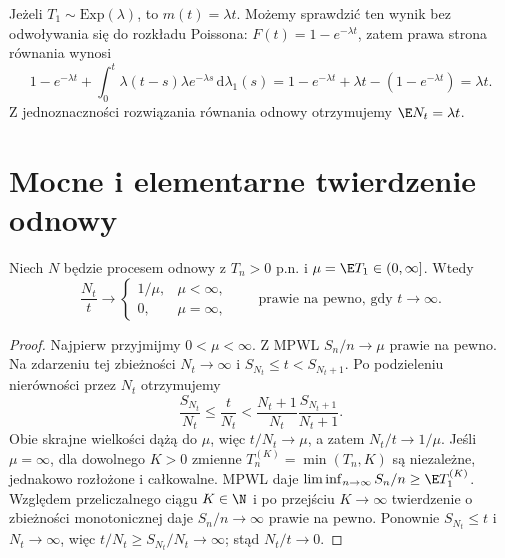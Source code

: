 \begin{przyklad}
Jeżeli $T_1\sim\mathrm{Exp}(\lambda)$, to $m(t)=\lambda t$.
Możemy sprawdzić ten wynik bez odwoływania się do rozkładu Poissona:
$F(t)=1-e^{-\lambda t}$, zatem prawa strona równania wynosi
\[
1-e^{-\lambda t}
+\int_0^t\lambda(t-s)\lambda e^{-\lambda s}\,\mathrm d\lambda_1(s)
=1-e^{-\lambda t}+\lambda t-(1-e^{-\lambda t})
=\lambda t.
\]
Z jednoznaczności rozwiązania równania odnowy otrzymujemy
$\E N_t=\lambda t$.
\end{przyklad}

\section{Mocne i elementarne twierdzenie odnowy}
\begin{twierdzenie}
Niech $N$ będzie procesem odnowy z $T_n>0$ p.n.
i $\mu=\E T_1\in(0,\infty]$.
Wtedy
\[
\frac{N_t}{t}\longrightarrow
\begin{cases}1/\mu,&\mu<\infty,\\0,&\mu=\infty,\end{cases}
\qquad\text{prawie na pewno, gdy }t\to\infty.
\]
\end{twierdzenie}
\begin{proof}
Najpierw przyjmijmy $0<\mu<\infty$.
Z MPWL $S_n/n\to\mu$ prawie na pewno.
Na zdarzeniu tej zbieżności $N_t\to\infty$ i
$S_{N_t}\le t<S_{N_t+1}$. Po podzieleniu nierówności
przez $N_t$ otrzymujemy
\[
\frac{S_{N_t}}{N_t}\le \frac{t}{N_t}
<\frac{N_t+1}{N_t}\frac{S_{N_t+1}}{N_t+1}.
\]
Obie skrajne wielkości dążą do $\mu$, więc
$t/N_t\to\mu$, a zatem $N_t/t\to1/\mu$.
Jeśli $\mu=\infty$, dla dowolnego $K>0$ zmienne
$T_n^{(K)}=\min(T_n,K)$ są niezależne, jednakowo rozłożone
i całkowalne. MPWL daje
$\liminf_{n\to\infty}S_n/n\ge\E T_1^{(K)}$.
Względem przeliczalnego ciągu $K\in\N$ i po przejściu
$K\to\infty$ twierdzenie o zbieżności monotonicznej
daje $S_n/n\to\infty$ prawie na pewno.
Ponownie $S_{N_t}\le t$ i $N_t\to\infty$, więc
$t/N_t\ge S_{N_t}/N_t\to\infty$; stąd $N_t/t\to0$.
\end{proof}

